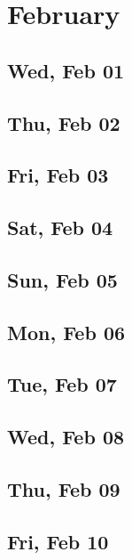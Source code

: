 \chapter{February}
	\section{Wed, Feb 01}
		
	\section{Thu, Feb 02}
		
	\section{Fri, Feb 03}
		
	\section{Sat, Feb 04}
		
	\section{Sun, Feb 05}
		
	\section{Mon, Feb 06}
		
	\section{Tue, Feb 07}
		
	\section{Wed, Feb 08}
		
	\section{Thu, Feb 09}
		
	\section{Fri, Feb 10}
		
